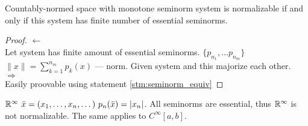 \begin{thm}
  Countably-normed space with monotone seminorm system is normalizable if and
  only if this system has finite number of essential seminorms.
\end{thm}

\begin{proof}
  $\leftarrow$ \\
  Let system has finite amount of essential seminorms. 
  $\{p_{n_1}, \dotsc p_{n_m}\}$ \\
  $\|x\| = \sum\limits_{k = 1}^{n_m}p_k(x)$ --- norm. Given system and this
  majorize each other. \\
  $\Rightarrow$ \\
  Easily proovable using statement \ref{stm:seminorm_equiv}
\end{proof}

\begin{ex}
  $\mathbb{R}^\infty\ \bar{x} = (x_1, \dotsc, x_n, \dotsc)\ p_n(\bar{x}) = |x_n|$. All
  seminorms are essential, thus $\mathbb{R}^\infty$ is not normalizable. The same
  applies to $C^\infty[a, b]$.
\end{ex}
